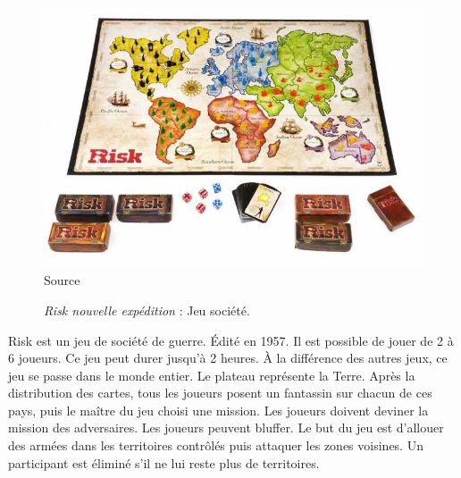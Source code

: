 \begin{figure}[H]
    \centering
    \includegraphics[scale=0.4]{data/risk.jpg}\\
    Source 
    \caption{\textit{Risk nouvelle expédition} : Jeu société.}
\end{figure}
Risk est un jeu de société de guerre. Édité en 1957. Il est possible de jouer de 2 à 6 joueurs. Ce jeu peut durer jusqu'à 2 heures. À la différence des autres jeux, ce jeu se passe dans le monde entier. Le plateau représente la Terre.
Après la distribution des cartes, tous les joueurs posent un fantassin sur chacun de ces pays, puis le maître du jeu choisi une mission. Les joueurs doivent deviner la mission des adversaires.
Les joueurs peuvent bluffer.
Le but du jeu est d'allouer des armées dans les territoires contrôlés puis attaquer les zones voisines. Un participant est éliminé s’il ne lui reste plus de territoires.



